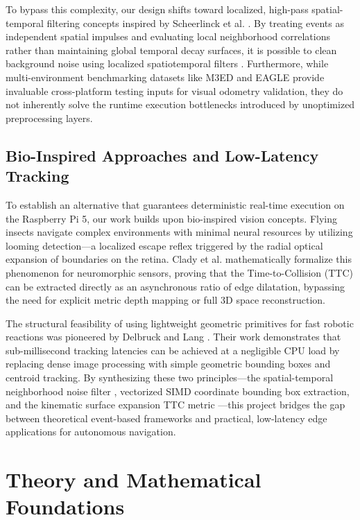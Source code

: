 \documentclass[conference]{IEEEtran}
\begin{document}
To bypass this complexity, our design shifts toward localized, high-pass spatial-temporal filtering concepts inspired by Scheerlinck et al. \cite{b8}. By treating events as independent spatial impulses and evaluating local neighborhood correlations rather than maintaining global temporal decay surfaces, it is possible to clean background noise using localized spatiotemporal filters \cite{b15}. Furthermore, while multi-environment benchmarking datasets like M3ED \cite{b1} and EAGLE \cite{b2} provide invaluable cross-platform testing inputs for visual odometry validation, they do not inherently solve the runtime execution bottlenecks introduced by unoptimized preprocessing layers.

\subsection{Bio-Inspired Approaches and Low-Latency Tracking}
To establish an alternative that guarantees deterministic real-time execution on the Raspberry Pi 5, our work builds upon bio-inspired vision concepts. Flying insects navigate complex environments with minimal neural resources by utilizing looming detection—a localized escape reflex triggered by the radial optical expansion of boundaries on the retina. Clady et al. \cite{b13} mathematically formalize this phenomenon for neuromorphic sensors, proving that the Time-to-Collision (TTC) can be extracted directly as an asynchronous ratio of edge dilatation, bypassing the need for explicit metric depth mapping or full 3D space reconstruction.

The structural feasibility of using lightweight geometric primitives for fast robotic reactions was pioneered by Delbruck and Lang \cite{b14}. Their work demonstrates that sub-millisecond tracking latencies can be achieved at a negligible CPU load by replacing dense image processing with simple geometric bounding boxes and centroid tracking. By synthesizing these two principles—the spatial-temporal neighborhood noise filter \cite{b15}, vectorized SIMD coordinate bounding box extraction, and the kinematic surface expansion TTC metric \cite{b13}—this project bridges the gap between theoretical event-based frameworks and practical, low-latency edge applications for autonomous navigation.
\section{Theory and Mathematical Foundations}
\end{document}
